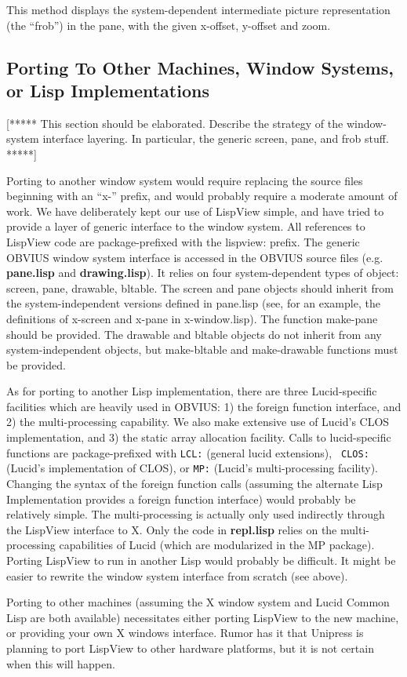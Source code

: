 \begin{description}
\item{}
This method displays the system-dependent intermediate picture
representation (the ``frob'') in the pane, with the given x-offset,
y-offset and zoom.

\end{description}

\subsection{Porting To Other Machines, Window Systems, or Lisp Implementations} 

[***** This section should be elaborated.  Describe the strategy of
the window-system interface layering.  In particular, the generic
screen, pane, and frob stuff.
*****]

Porting to another window system would require replacing the source
files beginning with an ``x-'' prefix, and would probably require a
moderate amount of work.  We have deliberately kept our use of
LispView simple, and have tried to provide a layer of generic
interface to the window system.  All references to LispView code are
package-prefixed with the lispview: prefix.  The generic OBVIUS window
system interface is accessed in the OBVIUS source files (e.g. {\bf
pane.lisp} and {\bf drawing.lisp}).  It relies on four
system-dependent types of object: screen, pane, drawable, bltable.
The screen and pane objects should inherit from the system-independent
versions defined in pane.lisp (see, for an example, the definitions of
x-screen and x-pane in x-window.lisp).  The function make-pane should
be provided.  The drawable and bltable objects do not inherit from any
system-independent objects, but make-bltable and make-drawable
functions must be provided.

As for porting to another Lisp implementation, there are three
Lucid-specific facilities which are heavily used in OBVIUS: 1) the
foreign function interface, and 2) the multi-processing capability.
We also make extensive use of Lucid's CLOS implementation, and 3) the
static array allocation facility.  Calls to lucid-specific functions
are package-prefixed with {\tt LCL:} (general lucid extensions), {\tt
CLOS:} (Lucid's implementation of CLOS), or {\tt MP:} (Lucid's
multi-processing facility).  Changing the syntax of the foreign
function calls (assuming the alternate Lisp Implementation provides a
foreign function interface) would probably be relatively simple.  The
multi-processing is actually only used indirectly through the LispView
interface to X.  Only the code in {\bf repl.lisp} relies on the
multi-processing capabilities of Lucid (which are modularized in the
MP package).  Porting LispView to run in another Lisp would probably
be difficult.  It might be easier to rewrite the window system
interface from scratch (see above).

Porting to other machines (assuming the X window system and Lucid
Common Lisp are both available) necessitates either porting LispView
to the new machine, or providing your own X windows interface.  Rumor
has it that Unipress is planning to port LispView to other hardware
platforms, but it is not certain when this will happen.

